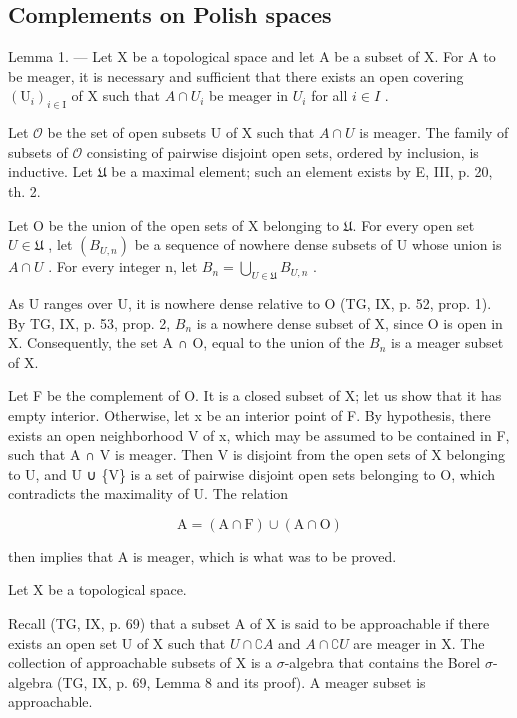 \subsection{Complements on Polish spaces}

Lemma 1. --- Let X be a topological space and let A be a subset of X. For A to be meager, it is necessary and sufficient that there exists an open covering \((\mathrm{U}_{i})_{i\in\mathrm{I}}\) of X such that \(A\cap U_{i}\) be meager in \(U_{i}\) for all \(i\in I\) .

Let \(\mathcal{O}\) be the set of open subsets U of X such that \(A \cap U\) is meager. The family of subsets of \(\mathcal{O}\) consisting of pairwise disjoint open sets, ordered by inclusion, is inductive. Let \(\mathfrak{U}\) be a maximal element; such an element exists by E, III, p. 20, th. 2.

Let O be the union of the open sets of X belonging to \(\mathfrak{U}\). For every open set \(U \in \mathfrak{U}\) , let \((B_{U,n})\) be a sequence of nowhere dense subsets of U whose union is \(A \cap U\) . For every integer n, let \(B_n = \bigcup_{U \in \mathfrak{U}} B_{U,n}\) .

As U ranges over U, it is nowhere dense relative to O (TG, IX, p. 52, prop. 1). By TG, IX, p. 53, prop. 2, \(B_{n}\) is a nowhere dense subset of X, since O is open in X. Consequently, the set A ∩ O, equal to the union of the \(B_{n}\) is a meager subset of X.

Let F be the complement of O. It is a closed subset of X; let us show that it has empty interior. Otherwise, let x be an interior point of F. By hypothesis, there exists an open neighborhood V of x, which may be assumed to be contained in F, such that A ∩ V is meager. Then V is disjoint from the open sets of X belonging to U, and U ∪ \{V\} is a set of pairwise disjoint open sets belonging to O, which contradicts the maximality of U. The relation

\[
\mathrm{A} = (\mathrm{A} \cap \mathrm{F}) \cup (\mathrm{A} \cap \mathrm{O})
\]

then implies that A is meager, which is what was to be proved.

Let X be a topological space.

Recall (TG, IX, p. 69) that a subset A of X is said to be approachable if there exists an open set U of X such that \(U \cap \complement A\) and \(A \cap \complement U\) are meager in X. The collection of approachable subsets of X is a \(\sigma\)-algebra that contains the Borel \(\sigma\)-algebra (TG, IX, p. 69, Lemma 8 and its proof). A meager subset is approachable.

